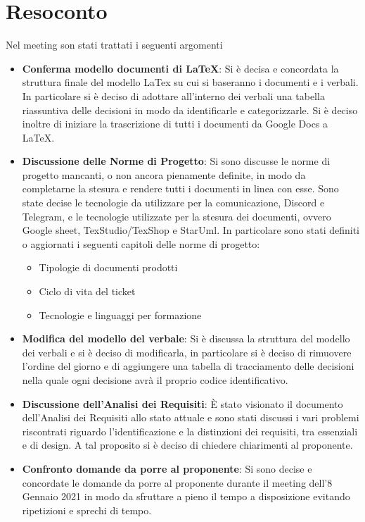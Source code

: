\section{Resoconto}
Nel meeting son stati trattati i seguenti argomenti
	\begin{itemize}
		\item\textbf{Conferma modello documenti di LaTeX}:
		Si è decisa e concordata la struttura finale del modello LaTex su cui si baseranno i documenti e i verbali. In particolare si è deciso di adottare all’interno dei verbali una tabella riassuntiva delle decisioni in modo da identificarle e categorizzarle. Si è deciso inoltre di iniziare la trascrizione di tutti i documenti da Google Docs a LaTeX.
		\item\textbf{Discussione delle Norme di Progetto}:
			Si sono discusse le norme di progetto mancanti, o non ancora pienamente definite, in modo da completarne la stesura e rendere tutti i documenti in linea con esse. Sono state decise le tecnologie da utilizzare per la comunicazione, Discord e Telegram, e le tecnologie utilizzate per la stesura dei documenti, ovvero Google sheet, TexStudio/TexShop e StarUml. 
			In particolare sono stati definiti o aggiornati i seguenti capitoli delle norme di progetto:
			\begin{itemize}
				\item Tipologie di documenti prodotti 
				\item Ciclo di vita del ticket 
				\item Tecnologie e linguaggi per formazione
			\end{itemize}
		\item\textbf{ Modifica del modello del verbale}:
		Si è discussa la struttura del modello dei verbali e si è deciso di modificarla, in particolare si è deciso di rimuovere l’ordine del giorno e di aggiungere una tabella di tracciamento delle decisioni nella quale ogni decisione avrà il proprio codice identificativo. 
		\item\textbf{Discussione dell’Analisi dei Requisiti}:
		È stato visionato il documento dell’Analisi dei Requisiti allo stato attuale e sono stati discussi i vari problemi riscontrati riguardo l’identificazione e la distinzioni dei requisiti, tra essenziali e di design. A tal proposito si è deciso di chiedere chiarimenti al proponente.
		\item\textbf{Confronto domande da porre al proponente}:
		Si sono decise e concordate le domande da porre al proponente durante il meeting dell’8 Gennaio 2021 in modo da sfruttare a pieno il tempo a disposizione evitando ripetizioni e sprechi di tempo.
	\end {itemize}